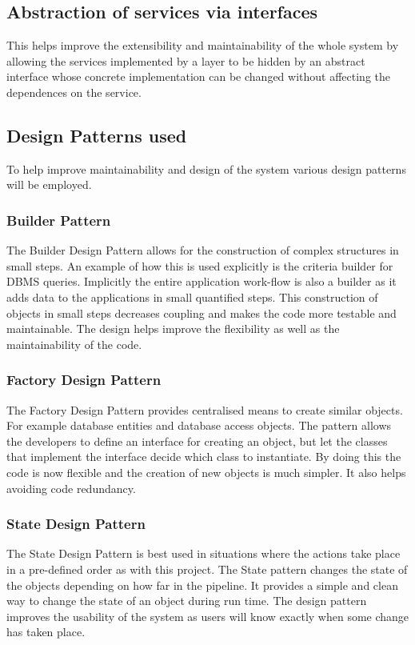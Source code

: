 \documentclass[12pt]{article}
\begin{document}
\subsection{Abstraction of services via interfaces}
This helps improve the extensibility and maintainability of the whole system by allowing the services implemented by a layer to be hidden by an abstract interface whose concrete implementation can be changed without affecting the dependences on the service.

\subsection{Design Patterns used}
To help improve maintainability and design of the system various design patterns will be employed.

\subsubsection{Builder Pattern}
The Builder Design Pattern allows for the construction of complex structures in small steps. An example of how this is used explicitly is the criteria builder for DBMS queries. Implicitly the entire application work-flow is also a builder as it adds data to the applications in small quantified steps. This construction of objects in small steps decreases coupling and makes the code more testable and maintainable. The design helps improve the flexibility as well as the maintainability of the code.  

\subsubsection{Factory Design Pattern}
The Factory Design Pattern provides centralised means to create similar objects. For example database entities and database access objects. The pattern allows the developers to define an interface for creating an object, but let the classes that implement the interface decide which class to instantiate. By doing this the code is now flexible and the creation of new objects is much simpler. It also helps avoiding code redundancy. 

\subsubsection{State Design Pattern}
The State Design Pattern is best used in situations where the actions take place in a pre-defined order as with this project. The State pattern changes the state of the objects depending on how far in the pipeline. It provides a simple and clean way to change the state of an object during run time. The design pattern improves the usability of the system as users will know exactly when some change has taken place. 
\end{document}
